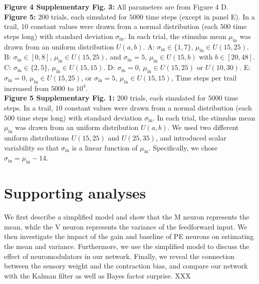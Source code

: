 \documentclass[10pt,a4paper,draft]{article}
\begin{document}
%
\textbf{Figure 4 Supplementary Fig. 3:} All parameters are from Figure 4 D.\\
%
\textbf{Figure 5:} $200$ trials, each simulated for $5000$ time steps (except in panel E). In a trail, $10$ constant values were drawn from a normal distribution (each $500$ time steps long) with standard deviation $\sigma_\mathrm{in}$. In each trial, the stimulus mean $\mu_\mathrm{in}$ was drawn from an uniform distribution $U(a, b)$. A: $\sigma_\mathrm{in} \in \lbrace1,7\rbrace$, $\mu_\mathrm{in} \in U(15, 25)$. B: $\sigma_\mathrm{in} \in [0,8]$, $\mu_\mathrm{in} \in U(15, 25)$, and $\sigma_\mathrm{in} = 5$, $\mu_\mathrm{in} \in U(15, b)$ with $b\in [20, 48]$. C: $\sigma_\mathrm{in} \in \lbrace2,5\rbrace$, $\mu_\mathrm{in} \in U(15, 15)$. D: $\sigma_\mathrm{in} = 0$, $\mu_\mathrm{in} \in U(15, 25)$ or $U(10, 30)$. E: $\sigma_\mathrm{in} = 0$, $\mu_\mathrm{in} \in U(15, 25)$, or $\sigma_\mathrm{in} = 5$, $\mu_\mathrm{in} \in U(15, 15)$,  Time steps per trail increased from $5000$ to $10^4$.\\
%
\textbf{Figure 5 Supplementary Fig. 1:} $200$ trials, each simulated for $5000$ time steps. In a trail, $10$ constant values were drawn from a normal distribution (each $500$ time steps long) with standard deviation $\sigma_\mathrm{in}$. In each trial, the stimulus mean $\mu_\mathrm{in}$ was drawn from an uniform distribution $U(a,b)$. We used two different uniform distributions $U(15, 25)$ and  $U(25, 35)$, and introduced scalar variability so that $\sigma_\mathrm{in}$ is a linear function of $\mu_\mathrm{in}$. Specifically, we chose $\sigma_\mathrm{in} = \mu_\mathrm{in} -14$.


\section{Supporting analyses}

We first describe a simplified model and show that the M neuron represents the mean, while the V neuron represents the variance of the feedforward input. We then investigate the impact of the gain and baseline of PE neurons on estimating the mean and variance. Furthermore, we use the simplified model to discuss the effect of neuromodulators in our network. Finally, we reveal the connection between the sensory weight and the contraction bias, and compare our network with the Kalman filter as well as Bayes factor surprise. XXX
\end{document}
